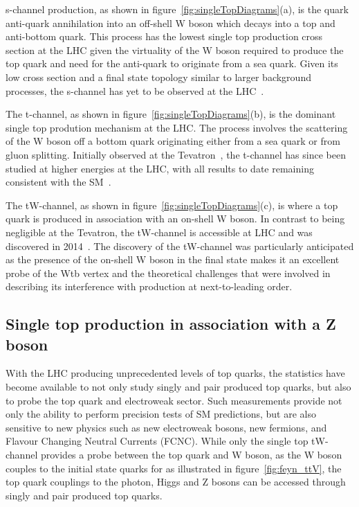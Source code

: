 s-channel production, as shown in figure~\ref{fig:singleTopDiagrams}(a), is the quark anti-quark annihilation into an off-shell W boson which decays into a top and anti-bottom quark.
This process has the lowest single top production cross section at the LHC given the virtuality of the W boson required to produce the top quark and need for the anti-quark to originate from a sea quark.
Given its low cross section and a final state topology similar to larger background processes, the s-channel has yet to be observed at the LHC~\cite{Khachatryan:2016ewo}.

The t-channel, as shown in figure~\ref{fig:singleTopDiagrams}(b), is the dominant single top prodution mechanism at the LHC.
The process involves the scattering of the W boson off a bottom quark originating either from a sea quark or from gluon splitting.
Initially observed at the Tevatron~\cite{Aaltonen:2009jj,Abazov:2009ii}, the t-channel has since been studied at higher energies at the LHC, with all results to date remaining consistent with the SM~\cite{Berta:2017ghf,Morton:2018wkb}.	

The tW-channel, as shown in figure~\ref{fig:singleTopDiagrams}(c), is where a top quark is produced in association with an on-shell W boson.
In contrast to being negligible at the Tevatron, the tW-channel is accessible at LHC and was discovered in 2014~\cite{Chatrchyan:2014tua}.
The discovery of the tW-channel was particularly anticipated as the presence of the on-shell W boson in the final state makes it an excellent probe of the Wtb vertex and the theoretical challenges that were involved in describing its interference with \ttbar production at next-to-leading order.

\subsection{Single top production in association with a Z boson}\label{subsec:tZqTheory}
With the LHC producing unprecedented levels of top quarks, the statistics have become available to not only study singly and pair produced top quarks, but also to probe the top quark and electroweak sector.
Such measurements provide not only the ability to perform precision tests of SM predictions, but are also sensitive to new physics such as new electroweak bosons, new fermions, and Flavour Changing Neutral Currents (FCNC).
While only the single top tW-channel provides a probe between the top quark and W boson, as the W boson couples to the initial state quarks for \ttW as illustrated in figure~\ref{fig:feyn_ttV}, the top quark couplings to the photon, Higgs and Z bosons can be accessed through singly and pair produced top quarks.

